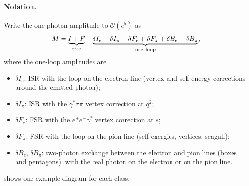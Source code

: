 \documentclass[11pt,a4paper]{article}
\begin{document}
\paragraph{Notation.} Write the one-photon amplitude to $\mathcal O(e^5)$ as
\[
  M = \underbrace{I+F}_{\rm tree}
    + \underbrace{\delta I_e+\delta I_\pi+\delta F_e+\delta F_\pi+\delta B_e+\delta B_\pi}_{\rm one\ loop},
\]
where the one-loop amplitudes are
\begin{itemize}
\item $\delta I_e$: ISR with the loop on the electron line (vertex and self-energy corrections
  around the emitted photon);
\item $\delta I_\pi$: ISR with the $\gamma^*\pi\pi$ vertex correction at $q^2$;
\item $\delta F_e$: FSR with the $e^+e^-\gamma^*$ vertex correction at $s$;
\item $\delta F_\pi$: FSR with the loop on the pion line (self-energies, vertices, seagull);
\item $\delta B_e$, $\delta B_\pi$: two-photon exchange between the electron and pion lines
  (boxes and pentagons), with the real photon on the electron or on the pion line.
\end{itemize}
 shows one example diagram for each class.
\end{document}
